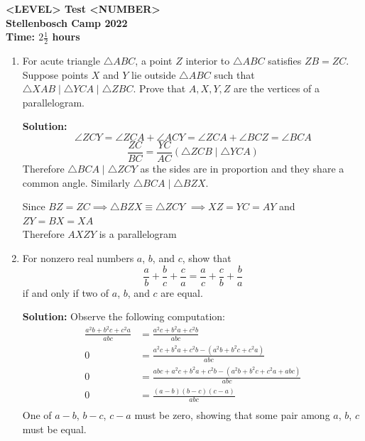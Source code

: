 \documentclass{article}
\begin{document}
\thispagestyle{empty}

\begin{center}
  \textbf{\Large <LEVEL> Test <NUMBER>}
  \\ \vspace{1em}
  \textbf{\large Stellenbosch Camp 2022}
  \\ \vspace{1em}
  \textbf{\large Time: $2\frac{1}{2}$ hours}
\end{center}

\bigskip

\begin{enumerate}[itemsep=\fill]

\item 
For acute triangle $\triangle ABC$, a point $Z$ interior to $\triangle ABC$ satisfies $ZB = ZC$.
Suppose points $X$ and $Y$ lie outside $\triangle ABC$ such that $\triangle XAB \mathop{|||} \triangle YCA \mathop{|||} \triangle ZBC$.
Prove that $A,X,Y,Z$ are the vertices of a parallelogram. 

\textbf{Solution:} $$\angle ZCY = \angle ZCA + \angle ACY = \angle ZCA + \angle BCZ = \angle BCA$$
$$\frac{ZC}{BC} = \frac{YC}{AC} (\triangle ZCB \mathop{|||} \triangle YCA)$$
Therefore $\triangle BCA \mathop{|||} \triangle ZCY$ as the sides are in proportion and they share a common angle. Similarly $\triangle BCA \mathop{|||} \triangle BZX$. 

Since $BZ = ZC \implies \triangle BZX \equiv \triangle ZCY$
$\implies XZ = YC = AY$ and $ZY = BX = XA$\\
Therefore $AXZY$ is a parallelogram 

\item %
For nonzero real numbers $a$, $b$, and $c$, show that
\[ \frac{a}{b} +\frac{b}{c} +\frac{c}{a} = \frac{a}{c} +\frac{c}{b} +\frac{b}{a} \]
if and only if two of $a$, $b$, and $c$ are equal.

\textbf{Solution:} Observe the following computation:
\begin{align*}
\frac{a^{2}b + b^{2}c + c^{2}a}{abc} & = \frac{a^{2}c + b^{2}a + c^{2}b}{abc}\\
 0 & = \frac{a^{2}c + b^{2}a + c^{2}b -(a^{2}b + b^{2}c + c^{2}a)}{abc} \\
 0 & = \frac{abc + a^{2}c + b^{2}a + c^{2}b - (a^{2}b + b^{2}c + c^{2}a+abc)}{abc} \\
 0 & = \frac{(a-b)(b-c)(c-a)}{abc} \\
\end{align*}
One of $a-b$, $b-c$, $c-a$ must be zero, showing that some pair among $a$, $b$, $c$ must be equal.


\end{enumerate}
\end{document}
